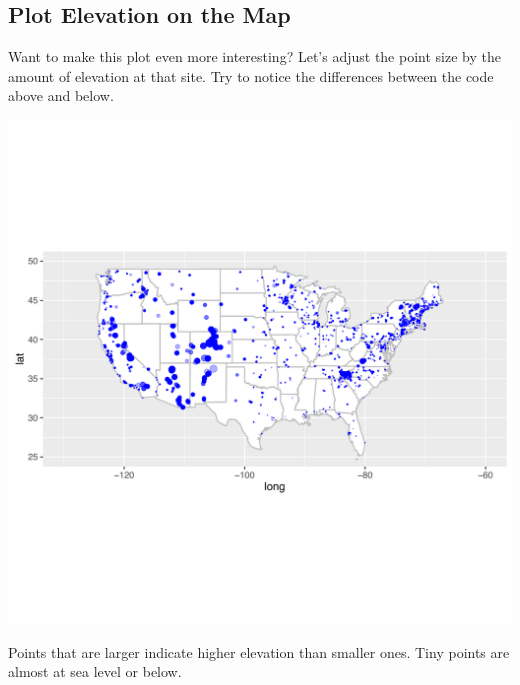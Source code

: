 \documentclass[11pt,twosided]{article}
\begin{document}
\newpage
\subsection{Plot Elevation on the Map}
Want to make this plot even more interesting?  Let's adjust the point size by the amount of elevation at that site.  Try to notice the differences between the code above and below.\\


\begin{tcolorbox}[breakable,boxrule=0.5pt,enhanced]
\end{tcolorbox}
\vspace{2ex}

\begin{center}
\includegraphics[width=6.5in]{usa_base_points_elevation}
\end{center}

Points that are larger indicate higher elevation than smaller ones.  Tiny points are almost at sea level or below.
\end{document}
